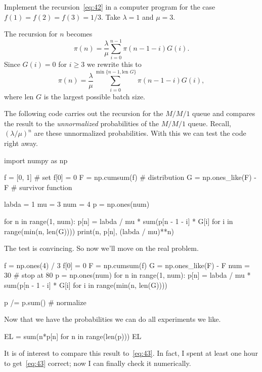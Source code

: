 \begin{exercise}
 Implement the recursion~\cref{eq:42} in a computer program for the case $f(1)=f(2)=f(3)=1/3$.
 Take $\lambda =1$ and $\mu = 3$.
\begin{solution}
 The recursion for $n$ becomes
\begin{equation*}
\pi(n) = \frac \lambda \mu \sum_{i=0}^{n-1} \pi(n-1-i)G(i).
\end{equation*}
Since $G(i) =0$ for $i\geq 3$ we rewrite this to 
\begin{equation*}
 \pi(n) = \frac\lambda \mu \sum_{i=0}^{\min\{n-1,\text{len } G\}} \pi(n-1-i)G(i),
\end{equation*}
where $\text{len } G$ is the largest possible batch size.

The following code carries out the recursion for the $M/M/1$ queue and compares the result to the \emph{unnormalized} probabilities of the $M/M/1$ queue.
Recall, $(\lambda/\mu)^n$ are these unnormalized probabilities.
With this we can test the code right away.

\begin{pyconsole}
import numpy as np

f = [0, 1] # set f[0] = 0
F = np.cumsum(f) # distribution 
G = np.ones_like(F) - F # survivor function

labda = 1
mu = 3
num = 4
p = np.ones(num)

for n in range(1, num):
 p[n] = labda / mu * sum(p[n - 1 - i] * G[i] for i in range(min(n, len(G))))
 print(n, p[n], (labda / mu)**n)

\end{pyconsole}
The test is convincing. So now we'll move on the real problem. 

\begin{pyconsole}
f = np.ones(4) / 3
f[0] = 0
F = np.cumsum(f)
G = np.ones_like(F) - F
num = 30 # stop at 80
p = np.ones(num)
for n in range(1, num):
 p[n] = labda / mu * sum(p[n - 1 - i] * G[i] for i in range(min(n, len(G))))

p /= p.sum() # normalize
\end{pyconsole}

Now that we have the probabilities we can do all experiments we like. 
\begin{pyconsole}
EL = sum(n*p[n] for n in range(len(p)))
EL 
\end{pyconsole}

It is of interest to compare this result to~\cref{eq:43}.
In fact, I spent at least one hour to get~\cref{eq:43} correct; now I can finally check it numerically.



\end{solution}
\end{exercise}
